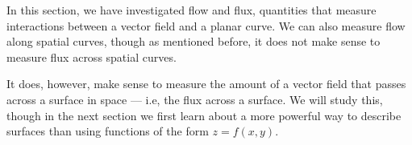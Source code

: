 In this section, we have investigated flow and flux, quantities that measure interactions between a vector field and a planar curve. We can also measure flow along spatial curves, though as mentioned before, it does not make sense to measure flux across spatial curves.

It does, however, make sense to measure the amount of a vector field that passes across a surface in space --- i.e, the flux across a surface. We will study this, though in the next section we first  learn about a more powerful way to describe surfaces than using functions of the form $z=f(x,y)$.

%

